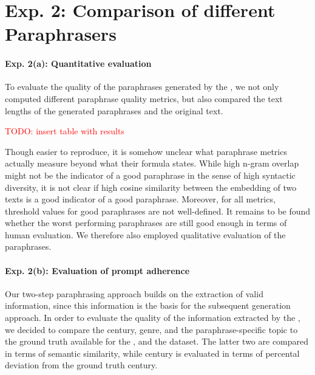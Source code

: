 \section{Exp. 2: Comparison of different Paraphrasers}



\paragraph{Exp. 2(a): Quantitative evaluation}
To evaluate the quality of the paraphrases generated by the \pgenerator{}, 
we not only computed different paraphrase quality metrics, 
but also compared the text lengths of the generated paraphrases and the original text.

\textcolor{red}{TODO: insert table with results}

Though easier to reproduce, it is somehow unclear what paraphrase metrics actually measure beyond what their formula states.
While high n-gram overlap might not be the indicator of a good paraphrase in the sense of high syntactic diversity, 
it is not clear if high cosine similarity between the embedding of two texts is a good indicator of a good paraphrase.
Moreover, for all metrics, threshold values for good paraphrases are not well-defined.
It remains to be found whether the worst performing paraphrases are still good enough in terms of human evaluation.
We therefore also employed qualitative evaluation of the paraphrases.


\paragraph{Exp. 2(b): Evaluation of prompt adherence}
Our two-step paraphrasing approach builds on the extraction of valid information, since this information is the basis for the subsequent generation approach.
In order to evaluate the quality of the information extracted by the \pextractor{}, we decided to compare the century, genre, and the paraphrase-specific topic to the ground truth available for the \dataBlog{}, \dataGutenberg{} and the \dataStudent{} dataset.
The latter two are compared in terms of semantic similarity, while century is evaluated in terms of percental deviation from the ground truth century.


